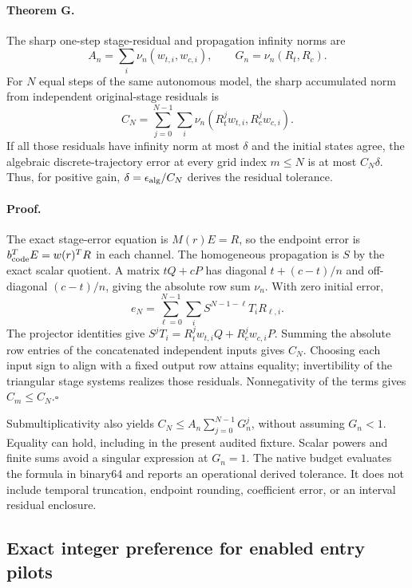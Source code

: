 \paragraph{Theorem G.}
The sharp one-step stage-residual and propagation infinity norms are
\begin{equation}
 A_n=\sum_i\nu_n(w_{t,i},w_{c,i}),\qquad
 G_n=\nu_n(R_t,R_c).
\end{equation}
For $N$ equal steps of the same autonomous model, the sharp accumulated
norm from independent original-stage residuals is
\begin{equation}
 C_N=\sum_{j=0}^{N-1}\sum_i
       \nu_n(R_t^j w_{t,i},R_c^j w_{c,i}).
\end{equation}
If all those residuals have infinity norm at most $\delta$ and the
initial states agree, the algebraic discrete-trajectory error at every
grid index $m\le N$ is at most $C_N\delta$. Thus, for positive gain,
$\delta=\epsilon_{\rm alg}/C_N$ derives the residual tolerance.

\paragraph{Proof.}
The exact stage-error equation is $M(r)E=R$, so the endpoint error is
$b_{\rm code}^TE=w(r)^TR$ in each channel. The homogeneous propagation
is $S$ by the exact scalar quotient. A matrix $tQ+cP$ has diagonal
$t+(c-t)/n$ and off-diagonal $(c-t)/n$, giving the absolute row sum
$\nu_n$. With zero initial error,
\begin{equation}
 e_N=\sum_{\ell=0}^{N-1}\sum_i
       S^{N-1-\ell}T_iR_{\ell,i}.
\end{equation}
The projector identities give
$S^jT_i=R_t^jw_{t,i}Q+R_c^jw_{c,i}P$. Summing the absolute row
entries of the concatenated independent inputs gives $C_N$. Choosing
each input sign to align with a fixed output row attains equality;
invertibility of the triangular stage systems realizes those residuals.
Nonnegativity of the terms gives $C_m\le C_N$.\hfill$\square$

Submultiplicativity also yields
$C_N\le A_n\sum_{j=0}^{N-1}G_n^j$, without assuming $G_n<1$.
Equality can hold, including in the present audited fixture. Scalar
powers and finite sums avoid a singular expression at $G_n=1$.
The native budget evaluates the formula in binary64 and reports an
operational derived tolerance. It does not include temporal truncation,
endpoint rounding, coefficient error, or an interval residual enclosure.

\subsection{Exact integer preference for enabled entry pilots}

